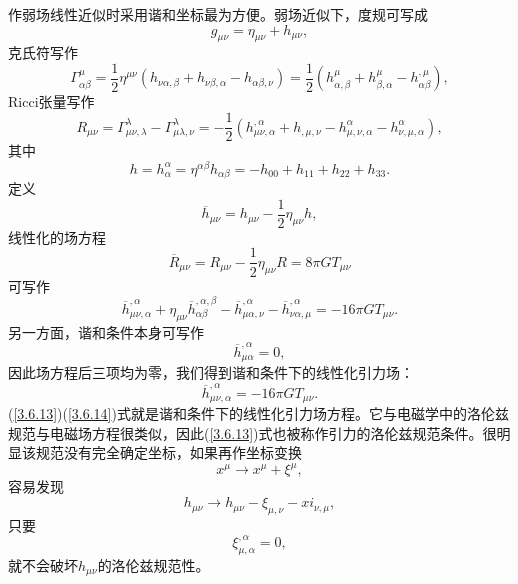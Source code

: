 \documentclass[11pt, a4paper, oneside, onecolumn]{ctexart}
\numberwithin{equation}{subsection}
\begin{document}
作弱场线性近似时采用谐和坐标最为方便。弱场近似下，度规可写成
\begin{equation}
g_{\mu\nu}=\eta_{\mu\nu}+h_{\mu\nu},
\end{equation}
克氏符写作
\begin{equation}
\Gamma_{\alpha\beta}^{\mu}=\frac12\eta^{\mu\nu}\left(h_{\nu\alpha,\beta}+h_{\nu\beta,\alpha}-h_{\alpha\beta,\nu}\right)=\frac12\left(h_{\alpha,\beta}^{\mu}+h_{\beta,\alpha}^{\mu}-h_{\alpha\beta}^{,\mu}\right),
\end{equation}
Ricci张量写作
\begin{equation}
R_{\mu\nu}=\Gamma_{\mu\nu,\lambda}^{\lambda}-\Gamma_{\mu\lambda,\nu}^{\lambda}=-\frac{1}{2}\left(h_{\mu\nu,\alpha}^{,\alpha}+h_{,\mu,\nu}-h_{\mu,\nu,\alpha}^{\alpha}-h_{\nu,\mu,\alpha}^{\alpha}\right),
\end{equation}
其中
\begin{equation}
h=h^{\alpha}_{\alpha}=\eta^{\alpha\beta}h_{\alpha\beta}=-h_{00}+h_{11}+h_{22}+h_{33}.
\end{equation}
定义
\begin{equation}
\overline{h}_{\mu\nu}=h_{\mu\nu}-\frac12\eta_{\mu\nu}h,
\end{equation}
线性化的场方程
\begin{equation}
\overline{R}_{\mu\nu}=R_{\mu\nu}-\frac{1}{2}\eta_{\mu\nu}R=8\pi GT_{\mu\nu}
\end{equation}
可写作
\begin{equation}
\overline{h}_{\mu\nu,\alpha}^{,\alpha}+\eta_{\mu\nu}\overline{h}_{\alpha\beta}^{,\alpha,\beta}-\overline{h}_{\mu\alpha,\nu}^{,\alpha}-\overline{h}_{\nu\alpha,\mu}^{,\alpha}=-16\pi GT_{\mu\nu}.
\end{equation}
另一方面，谐和条件本身可写作
\begin{equation}
\overline{h}_{\mu\alpha}^{,\alpha}=0,\label{3.6.13}
\end{equation}
因此场方程后三项均为零，我们得到谐和条件下的线性化引力场：
\begin{equation}
\overline{h}_{\mu\nu,\alpha}^{,\alpha}=-16\pi GT_{\mu\nu}.\label{3.6.14}
\end{equation}
(\ref{3.6.13})(\ref{3.6.14})式就是谐和条件下的线性化引力场方程。它与电磁学中的洛伦兹规范与电磁场方程很类似，因此(\ref{3.6.13})式也被称作引力的洛伦兹规范条件。很明显该规范没有完全确定坐标，如果再作坐标变换
\begin{equation}
x^{\mu}\to x^{\mu}+\xi^{\mu},
\end{equation}
容易发现
\begin{equation}
h_{\mu\nu}\to h_{\mu\nu}-\xi_{\mu,\nu}-xi_{\nu,\mu},
\end{equation}
只要
\begin{equation}
\xi^{,\alpha}_{\mu,\alpha}=0,\label{3.6.17}
\end{equation}
就不会破坏$h_{\mu\nu}$的洛伦兹规范性。
\end{document}

